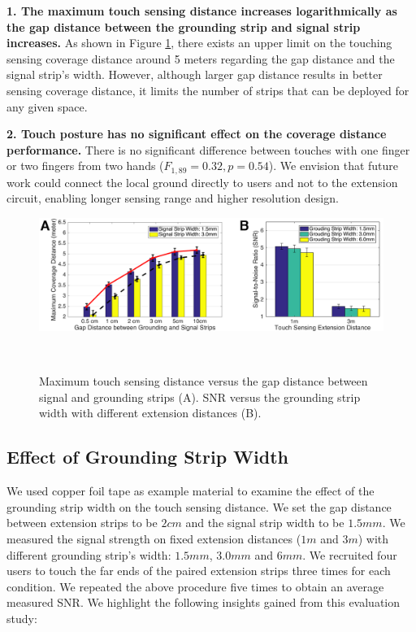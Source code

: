 \textbf{1. The maximum touch sensing distance increases logarithmically as the gap distance between the grounding strip and signal strip increases.} As shown in Figure \ref{fig:ground-effect}, there exists an upper limit on the touching sensing coverage distance around 5 meters regarding the gap distance and the signal strip's width. However, although larger gap distance results in better sensing coverage distance, it limits the number of strips that can be deployed for any given space.

\textbf{2. Touch posture has no significant effect on the coverage distance performance.} There is no significant difference between touches with one finger or two fingers from two hands ($F_{1,89} = 0.32, p = 0.54$). We envision that future work could connect the local ground directly to users and not to the extension circuit, enabling longer sensing range and higher resolution design.


\begin{figure}[ht]
\centering
  \includegraphics[width=0.95\columnwidth]{figures/grouding-gap-and-width.png}
  \setlength{\belowcaptionskip}{-8pt}
  \caption{Maximum touch sensing distance versus the gap distance between signal and grounding strips (A). SNR versus the grounding strip width with different extension distances (B).}~\label{fig:ground-effect}
\end{figure}

\subsection{Effect of Grounding Strip Width}

We used copper foil tape as example material to examine the effect of the grounding strip width on the touch sensing distance. We set the gap distance between extension strips to be $2 cm$ and the signal strip width to be $1.5 mm$. We measured the signal strength on fixed extension distances ($1m$ and $3m$) with different grounding strip's width: $1.5 mm$, $3.0 mm$ and $6 mm$. We recruited four users to touch the far ends of the paired extension strips three times for each condition. We repeated the above procedure five times to obtain an average measured SNR. We highlight the following insights gained from this evaluation study:


